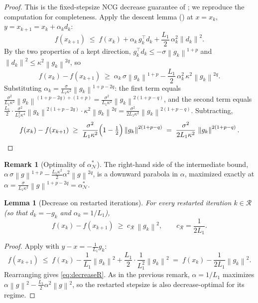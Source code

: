 \documentclass[11pt,a4paper]{article}
\theoremstyle{plain}
\newtheorem{lemma}{Lemma}
\theoremstyle{definition}
\newtheorem{remark}{Remark}
\newcommand{\norm}[1]{\left\|#1\right\|}
\newcommand{\Lone}{L_{1}}
\newcommand{\setN}{\mathcal{N}}
\newcommand{\setR}{\mathcal{R}}
\newcommand{\cR}{c_{\setR}}
\begin{document}
\begin{proof}
This is the fixed-stepsize NCG decrease guarantee of \cite{RoyerChan2022}; we
reproduce the computation for completeness. Apply the descent lemma
() at $x = x_{k}$, $y = x_{k+1} = x_{k}+\alpha_{k}d_{k}$:
\[
f(x_{k+1})
\;\le\; f(x_{k}) + \alpha_{k}\, g_{k}^{\top}d_{k}
        + \frac{\Lone}{2}\,\alpha_{k}^{2}\norm{d_{k}}^{2}.
\]
By the two properties of a kept direction,
$g_{k}^{\top}d_{k}\le-\sigma\norm{g_{k}}^{1+p}$ and
$\norm{d_{k}}^{2}\le\kappa^{2}\norm{g_{k}}^{2q}$, so
\[
f(x_{k}) - f(x_{k+1})
\;\ge\; \alpha_{k}\,\sigma\norm{g_{k}}^{1+p}
       - \frac{\Lone}{2}\,\alpha_{k}^{2}\,\kappa^{2}\norm{g_{k}}^{2q}.
\]
Substituting $\alpha_{k} = \tfrac{\sigma}{\Lone\kappa^{2}}\norm{g_{k}}^{1+p-2q}$:
the first term equals
$\tfrac{\sigma^{2}}{\Lone\kappa^{2}}\norm{g_{k}}^{(1+p-2q)+(1+p)}
= \tfrac{\sigma^{2}}{\Lone\kappa^{2}}\norm{g_{k}}^{2(1+p-q)}$,
and the second term equals
$\tfrac{\Lone}{2}\cdot\tfrac{\sigma^{2}}{\Lone^{2}\kappa^{4}}
\norm{g_{k}}^{2(1+p-2q)}\cdot\kappa^{2}\norm{g_{k}}^{2q}
= \tfrac{\sigma^{2}}{2\Lone\kappa^{2}}\norm{g_{k}}^{2(1+p-q)}$.
Subtracting,
\[
f(x_{k}) - f(x_{k+1})
\;\ge\; \frac{\sigma^{2}}{\Lone\kappa^{2}}
        \Bigl(1-\tfrac12\Bigr)\norm{g_{k}}^{2(1+p-q)}
\;=\; \frac{\sigma^{2}}{2\Lone\kappa^{2}}\,\norm{g_{k}}^{2(1+p-q)} .
\qedhere
\]
\end{proof}

\begin{remark}[Optimality of $\alpha^{\ast}_{\setN}$]
The right-hand side of the intermediate bound,
$\alpha\,\sigma\norm{g}^{1+p} - \tfrac{\Lone\kappa^{2}}{2}\alpha^{2}\norm{g}^{2q}$,
is a downward parabola in $\alpha$, maximized exactly at
$\alpha = \tfrac{\sigma}{\Lone\kappa^{2}}\norm{g}^{1+p-2q} = \alpha^{\ast}_{\setN}$.
\end{remark}

\begin{lemma}[Decrease on restarted iterations]\label{lem:decreaseR}
For every restarted iteration $k \in \setR$ (so that $d_{k} = -g_{k}$ and
$\alpha_{k} = 1/\Lone$),
\begin{equation}\label{eq:decreaseR}
f(x_{k}) - f(x_{k+1}) \;\geq\; \cR \, \norm{g_{k}}^{2},
\qquad
\cR = \frac{1}{2\Lone} .
\end{equation}
\end{lemma}

\begin{proof}
Apply  with $y - x = -\tfrac{1}{\Lone}g_{k}$:
\[
f(x_{k+1})
\;\le\; f(x_{k}) - \frac{1}{\Lone}\norm{g_{k}}^{2}
        + \frac{\Lone}{2}\cdot\frac{1}{\Lone^{2}}\norm{g_{k}}^{2}
\;=\; f(x_{k}) - \frac{1}{2\Lone}\norm{g_{k}}^{2}.
\]
Rearranging gives \eqref{eq:decreaseR}. As in the previous remark, $\alpha = 1/\Lone$
maximizes $\alpha\norm{g}^{2}-\tfrac{\Lone}{2}\alpha^{2}\norm{g}^{2}$, so the
restarted stepsize is also decrease-optimal for its regime.
\end{proof}
\end{document}
